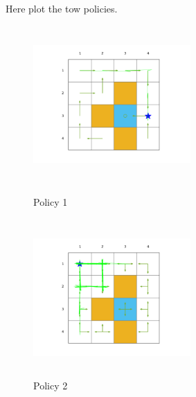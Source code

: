 \documentclass[UTF8]{ctexart}
\begin{document}

	Here plot the tow policies.
	\begin{figure}[H]
				\centering
				\begin{minipage}[t]{0.48\textwidth}
						\centering
						\includegraphics[width=6cm,height=6cm]{fig/policy1}
						\caption{Policy 1}
					\end{minipage}
				\begin{minipage}[t]{0.48\textwidth}
						\centering
						\includegraphics[width=6cm,height=6cm]{fig/policy2}
						\caption{Policy 2}
					\end{minipage}
	\end{figure}
	
\end{document}
